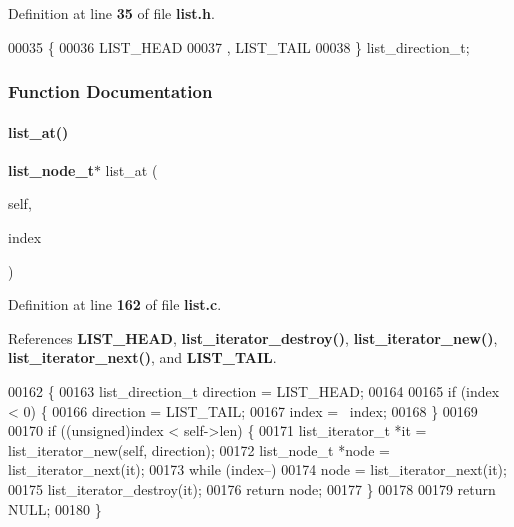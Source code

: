 Definition at line \textbf{ 35} of file \textbf{ list.\+h}.


\begin{DoxyCode}
00035              \{
00036     LIST_HEAD
00037   , LIST_TAIL
00038 \} list_direction_t;
\end{DoxyCode}


\subsubsection{Function Documentation}
\mbox{\label{a00029_ab3dacc64ceb63b0a0849312b0a14c91c}} 
\paragraph{list\+\_\+at()}
{\footnotesize\ttfamily \textbf{ list\+\_\+node\+\_\+t}$\ast$ list\+\_\+at (\begin{DoxyParamCaption}\item[{\textbf{ list\+\_\+t} $\ast$}]{self,  }\item[{int}]{index }\end{DoxyParamCaption})}



Definition at line \textbf{ 162} of file \textbf{ list.\+c}.



References \textbf{ L\+I\+S\+T\+\_\+\+H\+E\+AD}, \textbf{ list\+\_\+iterator\+\_\+destroy()}, \textbf{ list\+\_\+iterator\+\_\+new()}, \textbf{ list\+\_\+iterator\+\_\+next()}, and \textbf{ L\+I\+S\+T\+\_\+\+T\+A\+IL}.


\begin{DoxyCode}
00162                                               \{
00163   list_direction_t direction = LIST_HEAD;
00164 
00165   \textcolor{keywordflow}{if} (index < 0) \{
00166     direction = LIST_TAIL;
00167     index = ~index;
00168   \}
00169 
00170   \textcolor{keywordflow}{if} ((\textcolor{keywordtype}{unsigned})index < self->len) \{
00171     list_iterator_t *it = list_iterator_new(\textcolor{keyword}{self}, direction);
00172     list_node_t *node = list_iterator_next(it);
00173     \textcolor{keywordflow}{while} (index--)
00174       node = list_iterator_next(it);
00175     list_iterator_destroy(it);
00176     \textcolor{keywordflow}{return} node;
00177   \}
00178 
00179   \textcolor{keywordflow}{return} NULL;
00180 \}
\end{DoxyCode}
\mbox{\label{a00029_ac2d2be572a896cccd0e76d56eeefcbdb}} 
